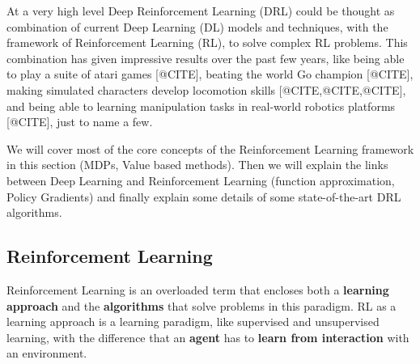 At a very high level Deep Reinforcement Learning (DRL) could be thought as combination 
of current Deep Learning (DL) models and techniques, with the framework of Reinforcement 
Learning (RL), to solve complex RL problems. This combination has given impressive 
results over the past few years, like being able to play a suite of atari games [@CITE], 
beating the world Go champion [@CITE], making simulated characters develop locomotion
skills [@CITE,@CITE,@CITE], and being able to learning manipulation tasks in real-world
robotics platforms [@CITE], just to name a few.

We will cover most of the core concepts of the Reinforcement Learning framework in 
this section (MDPs, Value based methods). Then we will explain the links between 
Deep Learning and Reinforcement Learning (function approximation, Policy Gradients) and
finally explain some details of some state-of-the-art DRL algorithms.

\subsection{Reinforcement Learning}

Reinforcement Learning is an overloaded term that encloses both a \textbf{learning approach}
and the \textbf{algorithms} that solve problems in this paradigm. RL as a learning approach
is a learning paradigm, like supervised and unsupervised learning, with the difference that
an \textbf{agent} has to \textbf{learn from interaction} with an environment.

\figrlloop

